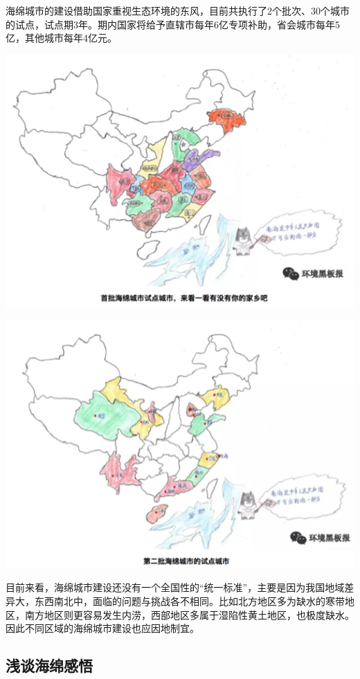 \documentclass[]{book}
\begin{document}
海绵城市的建设借助国家重视生态环境的东风，目前共执行了2个批次、30个城市的试点，试点期3年。期内国家将给予直辖市每年6亿专项补助，省会城市每年5亿，其他城市每年4亿元。

\includegraphics[width=6.67in]{images/ch5}

\includegraphics[width=6.67in]{images/ch6}

目前来看，海绵城市建设还没有一个全国性的``统一标准''，主要是因为我国地域差异大，东西南北中，面临的问题与挑战各不相同。比如北方地区多为缺水的寒带地区，南方地区则更容易发生内涝，西部地区多属于湿陷性黄土地区，也极度缺水。因此不同区域的海绵城市建设也应因地制宜。

\hypertarget{ux6d45ux8c08ux6d77ux7ef5ux611fux609f}{%
\subsection{浅谈海绵感悟}\label{ux6d45ux8c08ux6d77ux7ef5ux611fux609f}}
\end{document}
